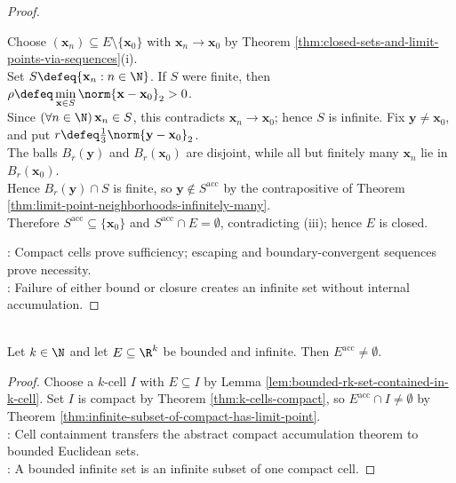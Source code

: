 \begin{theorem}
\begin{proof}
\begin{enumerate}[label=(\roman*)]
\begin{enumerate}[label=(\alph*)]
Choose $(\mathbf{x}_n)\subseteq E\setminus\{\mathbf{x}_0\}$ with $\mathbf{x}_n\to\mathbf{x}_0$ by Theorem \ref{thm:closed-sets-and-limit-points-via-sequences}(i).\\
Set $S\defeq\{\mathbf{x}_n:n\in\N\}$. If $S$ were finite, then $\rho\defeq\min\limits_{\mathbf{x}\in S}\norm{\mathbf{x}-\mathbf{x}_0}_2>0$.\\
Since $(\forall n\in\N)\,\mathbf{x}_n\in S$, this contradicts $\mathbf{x}_n\to\mathbf{x}_0$; hence $S$ is infinite. Fix $\mathbf{y}\ne\mathbf{x}_0$, and put $r\defeq\frac{1}{3}\norm{\mathbf{y}-\mathbf{x}_0}_2$.\\
The balls $B_r(\mathbf{y})$ and $B_r(\mathbf{x}_0)$ are disjoint, while all but finitely many $\mathbf{x}_n$ lie in $B_r(\mathbf{x}_0)$.\\
Hence $B_r(\mathbf{y})\cap S$ is finite, so $\mathbf{y}\notin S^{\operatorname{acc}}$ by the contrapositive of Theorem \ref{thm:limit-point-neighborhoods-infinitely-many}.\\
Therefore $S^{\operatorname{acc}}\subseteq\{\mathbf{x}_0\}$ and $S^{\operatorname{acc}}\cap E=\emptyset$, contradicting (iii); hence $E$ is closed.
\end{enumerate}
\end{enumerate}
: Compact cells prove sufficiency; escaping and boundary-convergent sequences prove necessity.\\
: Failure of either bound or closure creates an infinite set without internal accumulation.
\end{proof}
\end{theorem}

\begin{theorem} \label{thm:weierstrass-limit-point-rk} \\
Let $k\in\N$ and let $E\subseteq\R^k$ be bounded and infinite. Then $E^{\operatorname{acc}}\ne\emptyset$.
\begin{proof}
Choose a $k$-cell $I$ with $E\subseteq I$ by Lemma \ref{lem:bounded-rk-set-contained-in-k-cell}. Set $I$ is compact by Theorem \ref{thm:k-cells-compact}, so $E^{\operatorname{acc}}\cap I\ne\emptyset$ by Theorem \ref{thm:infinite-subset-of-compact-has-limit-point}.\\
: Cell containment transfers the abstract compact accumulation theorem to bounded Euclidean sets.\\
: A bounded infinite set is an infinite subset of one compact cell.
\end{proof}
\end{theorem}

